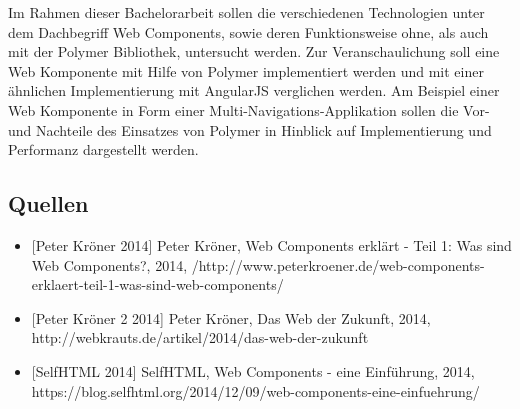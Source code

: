 Im Rahmen dieser Bachelorarbeit sollen die verschiedenen Technologien
unter dem Dachbegriff Web Components, sowie deren Funktionsweise ohne,
als auch mit der Polymer Bibliothek, untersucht werden. Zur
Veranschaulichung soll eine Web Komponente mit Hilfe von Polymer
implementiert werden und mit einer ähnlichen Implementierung mit
AngularJS verglichen werden. Am Beispiel einer Web Komponente in Form
einer Multi-Navigations-Applikation sollen die Vor- und Nachteile des
Einsatzes von Polymer in Hinblick auf Implementierung und Performanz
dargestellt werden.

\subsection{Quellen}\label{quellen}

\begin{itemize}
\item
  {[}Peter Kröner 2014{]} Peter Kröner, Web Components erklärt - Teil 1:
  Was sind Web Components?, 2014,
  /http://www.peterkroener.de/web-components-erklaert-teil-1-was-sind-web-components/
\item
  {[}Peter Kröner 2 2014{]} Peter Kröner, Das Web der Zukunft, 2014,
  http://webkrauts.de/artikel/2014/das-web-der-zukunft
\item
  {[}SelfHTML 2014{]} SelfHTML, Web Components - eine Einführung, 2014,
  https://blog.selfhtml.org/2014/12/09/web-components-eine-einfuehrung/
\end{itemize}
